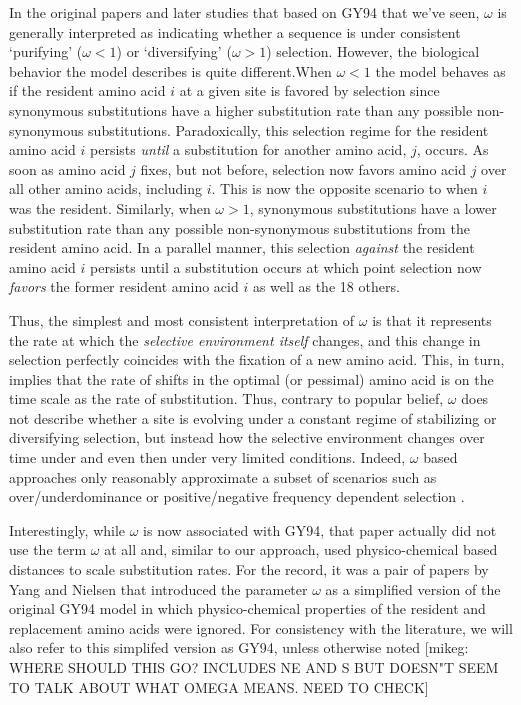 \documentclass[12pt,letterpaper]{article}
\newcommand{\PC}{physico-chemical\xspace}
\begin{document}
{In the original papers \citep{GoldmanAndYang1994,YangAndNielsen1998,NielsenAndYang1998} and later studies that based on GY94 that we've seen, $\omega$ is generally interpreted as indicating whether a sequence is under consistent `purifying' ($\omega < 1$) or `diversifying' ($\omega > 1$) selection.
However, the biological behavior the model describes is quite different.When $\omega < 1$ the model behaves as if the resident amino acid $i$ at a given site is favored by selection since synonymous substitutions have a higher substitution rate than any possible non-synonymous substitutions.
Paradoxically, this selection regime for the resident amino acid $i$ persists \emph{until} a substitution for another amino acid, $j$, occurs.
As soon as amino acid $j$ fixes, but not before, selection now favors amino acid $j$ over all other amino acids, including $i$.
This is now the opposite scenario to when $i$ was the resident.
Similarly, when $\omega > 1$, synonymous substitutions have a lower substitution rate than any possible non-synonymous substitutions from the resident amino acid.
In a parallel manner, this selection \emph{against} the resident amino acid $i$ persists until a substitution occurs at which point selection now \emph{favors} the former resident amino acid $i$ as well as the 18 others.

Thus, the simplest and most consistent interpretation of $\omega$ is that it represents the rate at which the \emph{selective environment itself} changes, and this change in selection perfectly coincides with the fixation of a new amino acid.
This, in turn, implies that the rate of shifts in the optimal (or pessimal) amino acid is on the time scale as the rate of substitution.
Thus, contrary to popular belief,  $\omega$ does not describe whether a site is evolving under a constant regime of stabilizing or diversifying selection, but instead how the selective environment changes over time under and even then under very limited conditions.
Indeed, $\omega$ based approaches only reasonably approximate a subset of scenarios such as over/underdominance or positive/negative frequency dependent selection \citep{HughesAndNei1988,Nowak2006}.

Interestingly, while $\omega$ is now associated with GY94, that paper actually did not use the term $\omega$ at all and, similar to our approach, used \PC based distances to scale substitution rates.
For the record, it was a pair of papers by Yang and Nielsen \citep{NielsenAndYang1998,YangAndNielsen1998} that introduced the parameter $\omega$ as a simplified version of the original GY94 model in which \PC properties of the resident and replacement amino acids were ignored.
For consistency with the literature, we will also refer to this simplifed version as GY94, unless otherwise noted
[mikeg: WHERE SHOULD THIS GO? \citet{NielsenAndYang2003} INCLUDES NE AND S BUT DOESN"T SEEM TO TALK ABOUT WHAT OMEGA MEANS.
NEED TO CHECK]

}
\end{document}
